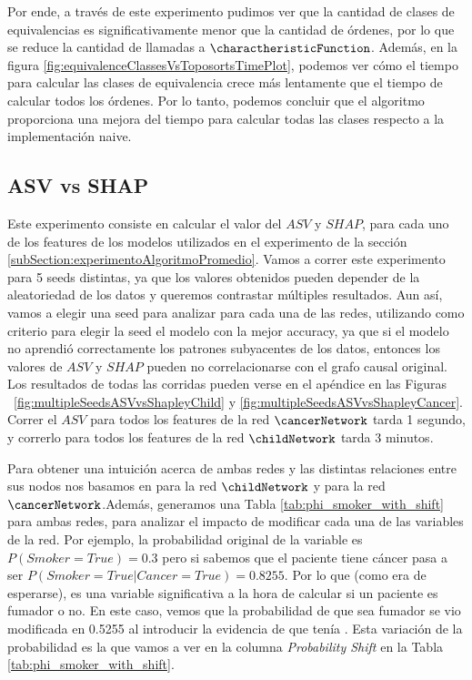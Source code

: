 Por ende, a través de este experimento pudimos ver que la cantidad de clases de equivalencias es significativamente menor que la cantidad de órdenes, por lo que se reduce la cantidad de llamadas a $\charactheristicFunction$. Además, en la figura \ref{fig:equivalenceClassesVsToposortsTimePlot}, podemos ver cómo el tiempo para calcular las clases de equivalencia crece más lentamente que el tiempo de calcular todos los órdenes. Por lo tanto, podemos concluir que el algoritmo proporciona una mejora del tiempo para calcular todas las clases respecto a la implementación naive.

\subsection{ASV vs SHAP}


Este experimento consiste en calcular el valor del $ASV$ y $SHAP$, para cada uno de los features de los modelos utilizados en el experimento de la sección \ref{subSection:experimentoAlgoritmoPromedio}. Vamos a correr este experimento para 5 seeds distintas, ya que los valores obtenidos pueden depender de la aleatoriedad de los datos y queremos contrastar múltiples resultados. Aun así, vamos a elegir una seed para analizar para cada una de las redes, utilizando como criterio para elegir la seed el modelo con la mejor accuracy, ya que si el modelo no aprendió correctamente los patrones subyacentes de los datos, entonces los valores de $ASV$ y $SHAP$ pueden no correlacionarse con el grafo causal original. Los resultados de todas las corridas pueden verse en el apéndice en las Figuras ~\ref{fig:multipleSeedsASVvsShapleyChild} y \ref{fig:multipleSeedsASVvsShapleyCancer}. Correr el $ASV$ para todos los features de la red $\cancerNetwork$ tarda 1 segundo, y correrlo para todos los features de la red $\childNetwork$ tarda 3 minutos. 

Para obtener una intuición acerca de ambas redes y las distintas relaciones entre sus nodos nos basamos en \cite{childNetwork} para la red $\childNetwork$ y \cite{cancerNetwork} para la red $\cancerNetwork$.Además, generamos una Tabla \ref{tab:phi_smoker_with_shift} para ambas redes, para analizar el impacto de modificar cada una de las variables de la red. Por ejemplo, la probabilidad original de la variable  es $P(Smoker=True)=0.3$ pero si sabemos que el paciente tiene cáncer pasa a ser $P(Smoker=True|Cancer=True)=0.8255$. Por lo que (como era de esperarse),  es una variable significativa a la hora de calcular si un paciente es fumador o no. En este caso, vemos que la probabilidad de que sea fumador se vio modificada en 0.5255 al introducir la evidencia de que tenía . Esta variación de la probabilidad es la que vamos a ver en la columna \emph{Probability Shift} en la Tabla \ref{tab:phi_smoker_with_shift}.

